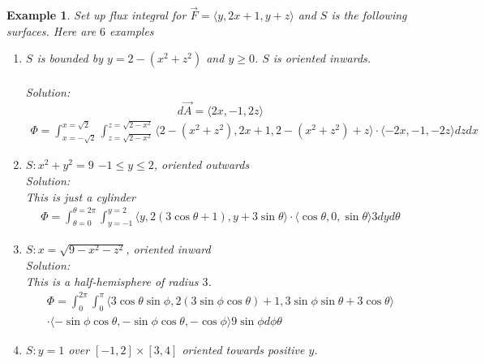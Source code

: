 \documentclass[11pt]{article}
\newtheorem{ex}{Example}
\begin{document}
      \begin{ex}
        Set up flux integral for $\vec{F} = \langle y, 2x+1, y+z \rangle $ and $S$ is the following surfaces. Here are $6$ examples
        \begin{enumerate}
               \item $S$ is bounded by
        $y = 2-(x^{2} + z^{2})$ and $y \ge 0$. $S$ is oriented inwards.\\
        \\
                Solution: \\
                \[d\vec{A} = \langle 2x,-1,2z\rangle \]
                \begin{align*}
                  \Phi = \int_{x=-\sqrt{2}}^{x=\sqrt{2}} \int_{z=\sqrt{2-x^{2}}}^{z=\sqrt{2-x^{2}}} \langle 2-(x^{2}+z^{2}), 2x+1, 2-(x^{2}+z^{2})+z\rangle\cdot\langle-2x, -1, -2z \rangle dzdx
                  \end{align*}
          \item $S: x^{2}+y^{2} = 9$ $-1 \le y \le 2$, oriented outwards \\

                Solution: \\
                This is just a cylinder
                \begin{align*}
                  \Phi  = \int_{\theta= 0}^{\theta=2\pi}\int_{y=-1}^{y=2} \langle y,2(3\cos\theta+1), y + 3\sin\theta \rangle \cdot \langle \cos\theta, 0, \sin\theta \rangle 3 dy d\theta
                  \end{align*}
          \item $S: x = \sqrt{9-x^{2}-z^{2}}$, oriented inward\\
                Solution: \\
                This is a half-hemisphere of radius $3$.
                \begin{align*}
                  \Phi  = \int_{0}^{2\pi}\int_{0}^{\pi} \langle 3\cos\theta\sin\phi, 2(3\sin\phi\cos\theta) + 1, 3\sin\phi\sin\theta + 3\cos\theta \rangle\\ \cdot \langle -\sin\phi\cos\theta, -\sin\phi\cos\theta, -\cos\phi \rangle 9\sin\phi d\phi\theta
                  \end{align*}
          \item $S: y=1$ over $[-1, 2] \times [3, 4]$ oriented towards positive $y$.


\end{enumerate}
\end{ex}
\end{document}
